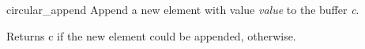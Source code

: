 \begin{DoxyDocu}{circular\_append}
\label{circular_8h_afe49685aefce31ecd0d3fa61e0bb39c8_afe49685aefce31ecd0d3fa61e0bb39c8}
Append a new element with value {\itshape value} to the buffer {\itshape c}.

\begin{DoxyReturn}{Returns}
c if the new element could be appended,  otherwise.
\end{DoxyReturn}


\end{DoxyDocu}
